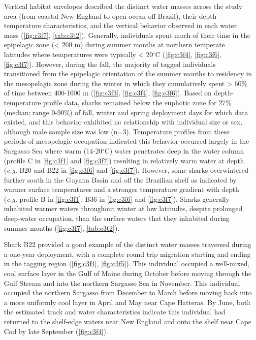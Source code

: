 Vertical habitat envelopes described the distinct water masses across the study area (from coastal New England to open ocean off Brazil), their depth-temperature characteristics, and the vertical behavior observed in each water mass (\cref{fig:c3f7}, \cref{tab:c3t2}). Generally, individuals spent much of their time in the epipelagic zone (< 200 m) during summer months at northern temperate latitudes where temperatures were typically < 20$^{\circ}$C (\cref{fig:c3f4}, \cref{fig:c3f6}, \cref{fig:c3f7}). However, during the fall, the majority of tagged individuals transitioned from the epipelagic orientation of the summer months to residency in the mesopelagic zone during the winter in which they cumulatively spent > 60\% of time between 400-1000 m (\cref{fig:c3f3}, \cref{fig:c3f4}, \cref{fig:c3f6}). Based on depth-temperature profile data, sharks remained below the euphotic zone for 27\% (median; range 0-90\%) of fall, winter and spring deployment days for which data existed, and this behavior exhibited no relationship with individual size or sex, although male sample size was low (n=3). Temperature profiles from these periods of mesopelagic occupation indicated this behavior occurred largely in the Sargasso Sea where warm (14-20$^{\circ}$C) water penetrates deep in the water column (profile C in \cref{fig:c3f1} and \cref{fig:c3f7}) resulting in relatively warm water at depth (\emph{e.g.} B20 and B22 in \cref{fig:c3f6} and \cref{fig:c3f7}). However, some sharks overwintered further south in the Guyana Basin and off the Brazilian shelf as indicated by warmer surface temperatures and a stronger temperature gradient with depth (\emph{e.g.} profile B in \cref{fig:c3f1}, B36 in \cref{fig:c3f6} and \cref{fig:c3f7}). Sharks generally inhabited warmer waters throughout winter at low latitudes, despite prolonged deep-water occupation, than the surface waters that they inhabited during summer months (\cref{fig:c3f7}, \cref{tab:c3t2}).

Shark B22 provided a good example of the distinct water masses traversed during a one-year deployment, with a complete round trip migration starting and ending in the tagging region (\cref{fig:c3f4}, \cref{fig:c3f5}). This individual occupied a well-mixed, cool surface layer in the Gulf of Maine during October before moving through the Gulf Stream and into the northern Sargasso Sea in November. This individual occupied the northern Sargasso from December to March before moving back into a more uniformly cool layer in April and May near Cape Hatteras. By June, both the estimated track and water characteristics indicate this individual had returned to the shelf-edge waters near New England and onto the shelf near Cape Cod by late September (\cref{fig:c3f4}).

